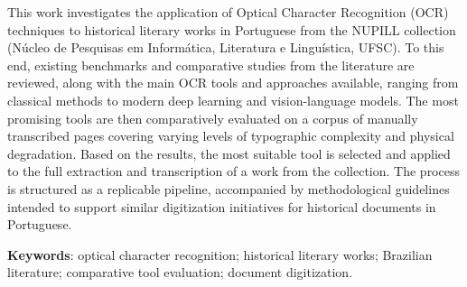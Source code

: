 \documentclass[
  12pt,
  oneside,
  a4paper,
  chapter=TITLE,
  section=TITLE,
  english,
  brazil
]{abntex2}
\newcommand{\topic}[1]{\textit{\textcolor{gray}{[TODO: #1]}}}
\begin{document}
\begin{resumo}[Abstract]

This work investigates the application of Optical Character Recognition (OCR) techniques
to historical literary works in Portuguese from the NUPILL collection (Núcleo de
Pesquisas em Informática, Literatura e Linguística, UFSC). To this end, existing
benchmarks and comparative studies from the literature are reviewed, along with the
main OCR tools and approaches available, ranging from classical methods to modern
deep learning and vision-language models. The most promising tools are then
comparatively evaluated on a corpus of manually transcribed pages covering varying
levels of typographic complexity and physical degradation. Based on the results, the
most suitable tool is selected and applied to the full extraction and transcription of
a work from the collection. The process is structured as a replicable pipeline,
accompanied by methodological guidelines intended to support similar digitization
initiatives for historical documents in Portuguese.

\vspace{\onelineskip}

\noindent
\textbf{Keywords}: optical character recognition; historical literary works; Brazilian
literature; comparative tool evaluation; document digitization.

\end{resumo}





\listoffigures*
\cleardoublepage
\end{document}
